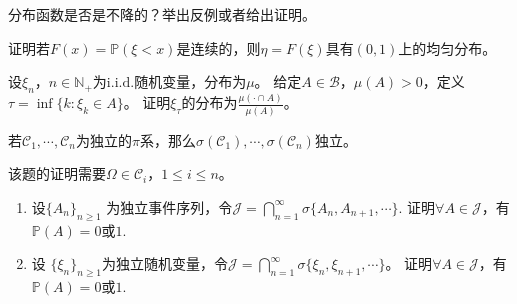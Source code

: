 \documentclass{ctexart}
\newif\ifpreface
\begin{document}
\large
\setlength{\baselineskip}{1.2em}
\ifpreface

\newgeometry{left=2cm,right=2cm,top=2cm,bottom=2cm}
\else
{}
\maketitle
\fi
\begin{problem}\label{pro:5}
  分布函数是否是不降的？举出反例或者给出证明。
\end{problem}

\begin{problem}\label{pro:7}
  证明若\(F(x)=\mathbb{P}(\xi < x) \)是连续的，则\(\eta = F(\xi) \)具有\((0,1) \)上的均匀分布。
\end{problem}

\begin{problem}\label{pro:9}
  设\(\xi_n，n \in \mathbb{N}_{+} \)为\(\mathrm{i.i.d.}  \)随机变量，分布为\(\mu \)。
  给定\(A \in \mathcal{B} \)，\(\mu(A) >0 \)，定义\(\tau = \inf\{k:\xi_k \in A\} \)。
  证明\(\xi_{\tau} \)的分布为\(\frac{\mu(\cdot \cap A)}{\mu(A)} \)。
\end{problem}
\begin{problem}\label{pro:11}
  若\(\mathcal{C}_1,\cdots,\mathcal{C}_n \)为独立的\(\pi \)系，那么\(\sigma(\mathcal{C}_1),\cdots,\sigma(\mathcal{C}_n)\)独立。
\end{problem}
\begin{solution}
  该题的证明需要\(\Omega \in \mathcal{C}_i，1 \leq i \leq n \)。
\end{solution}

\begin{problem}\label{pro:12}
  \begin{enumerate}
    \item 设\(\{A_n\}_{n \geq 1} \) 为独立事件序列，令\(\mathcal{J} = \bigcap_{n=1}^{\infty} \sigma\{A_n,A_{n + 1},\cdots\}. \)
      证明\(\forall A \in \mathcal{J} \)，有\(\mathbb{P} (A) =0 \)或\(1 \).
    \item 设 \(\{\xi_n\}_{n \geq 1} \)为独立随机变量，令\(\mathcal{J} = \bigcap_{n=1}^{\infty} \sigma\{\xi_n,\xi_{n + 1},\cdots\} \)。
      证明\(\forall A \in \mathcal{J} \)，有\(\mathbb{P}(A)=0 \)或\(1 \).
  \end{enumerate}
\end{problem}
\end{document}

